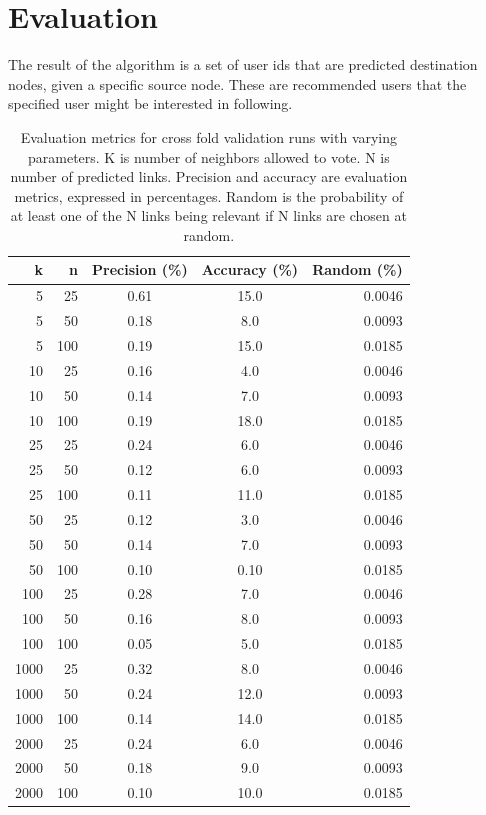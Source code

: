 
\chapter{Evaluation}

The result of the algorithm is a set of user ids that are predicted destination nodes, given a specific source node. These are recommended users that the specified user might be interested in following. 
\begin{table}[t]
\caption{Evaluation metrics for cross fold validation runs with varying parameters. K is number of neighbors allowed to vote. N is number of predicted links. Precision and accuracy are evaluation metrics, expressed in percentages. Random is the probability of at least one of the N links being relevant if N links are chosen at random.}
\label{results}
\vskip 0.15in
\begin{center}
\begin{small}
\begin{sc}
\begin{tabular}{rrccr}
\hline
k & n & Precision (\%) & Accuracy (\%) & Random (\%) \\
\hline
5      & 25 & 0.61 & 15.0 & 0.0046\\
5      & 50 & 0.18 & 8.0 & 0.0093 \\
5      & 100&0.19 & 15.0 & 0.0185\\
10    & 25 & 0.16& 4.0 & 0.0046\\
10    & 50 & 0.14 & 7.0 & 0.0093\\
10    & 100&0.19 & 18.0 & 0.0185 \\
25    & 25 & 0.24 & 6.0  & 0.0046\\
25    & 50 & 0.12 & 6.0  & 0.0093\\
25    &100&0.11 & 11.0  & 0.0185\\  
50    & 25 &0.12 & 3.0 & 0.0046\\
50    & 50 & 0.14 & 7.0  & 0.0093\\
50    &100& 0.10 & 0.10  & 0.0185\\
100 & 25 & 0.28 & 7.0  & 0.0046\\
100 & 50 & 0.16 & 8.0  & 0.0093\\
100 &100& 0.05 & 5.0  & 0.0185\\
1000&25&0.32 & 8.0  & 0.0046\\
1000&50&0.24& 12.0  & 0.0093\\
1000&100&0.14&14.0  & 0.0185\\
2000&25&0.24&6.0 & 0.0046\\
2000&50&0.18&9.0 & 0.0093\\
2000&100&0.10&10.0  & 0.0185\\
\hline
\end{tabular}
\end{sc}
\end{small}
\end{center}
\vskip -0.1in
\end{table}


